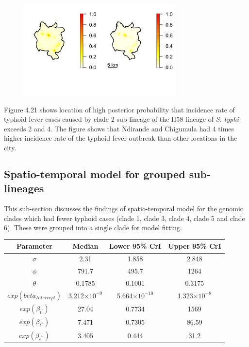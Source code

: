 \documentclass[12pt,a4paper]{report}
\begin{document}
\begin{figure}[H]
\begin{center}
\includegraphics[width = \linewidth, height = 50mm]{Exceedance Probabilities - Major 2.png}
\end{center}
\end{figure}

Figure 4.21 shows location of high posterior probability that incidence rate of typhoid fever cases caused by clade 2 sub-lineage of the H58 lineage of \textit{S. typhi} exceeds 2 and 4. The figure shows that Ndirande and Chigumula had 4 times higher incidence rate of the typhoid fever outbreak than other locations in the city.

\subsection{Spatio-temporal model for grouped sub-lineages}

This sub-section discusses the findings of spatio-temporal model for the genomic clades which had fewer typhoid cases (clade 1, clade 3, clade 4, clade 5 and clade 6). These were grouped into a single clade for model fitting.

\begin{table}[h]
    \centering
    \begin{tabular}{cccc}
     \toprule
         Parameter & Median & Lower 95\% CrI & Upper 95\% CrI \\ \midrule
        $\sigma$ & 2.31 & 1.858 & 2.848 \\
        $\phi$ & 791.7 & 495.7 & 1264 \\
        $\theta$ & 0.1785 & 0.1001 & 0.3175 \\
        $exp(beta_{Intercept})$ & 3.212$\times10^{-9}$ & 5.664$\times10^{-10}$ & 1.323$\times10^{-8}$ \\
        $exp(\beta_{t^{'}})$ & 27.04 & 0.7734 & 1569 \\
        $exp(\beta_{t^{''}})$ & 7.471 & 0.7305 & 86.59 \\
        $exp(\beta_{t^{'''}})$ & 3.405 & 0.444 & 31.2 \\
         \bottomrule
    \end{tabular}
\end{table}
\end{document}

